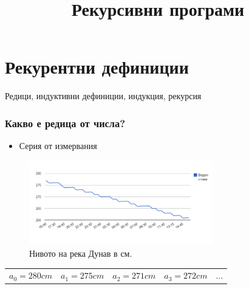 \documentclass{beamer}
\begin{document}
\title[Увод в програмирането]{Рекурсивни програми}
\frame{\titlepage}


\section{Рекурентни дефиниции}

\begin{frame}
\centerline{Редици, индуктивни дефиниции, индукция, рекурсия}
\end{frame}


\begin{frame}[fragile]
\frametitle{Какво е редица от числа?}

\begin{itemize}
  \item Серия от измервания
\end{itemize}



\begin{figure}[]
  \centering
  \includegraphics[width=8cm]{images/danube}
  \caption{Нивото на река Дунав в см.}
\end{figure}


\begin{flushleft}
\begin{tabular}{|c|c|c|c|c}
$a_0=280cm$ & $a_1=275cm$ & $a_2=271cm$ & $a_3=272cm$ & ...
\end{tabular}

\end{flushleft}


\end{frame}
\end{document}
